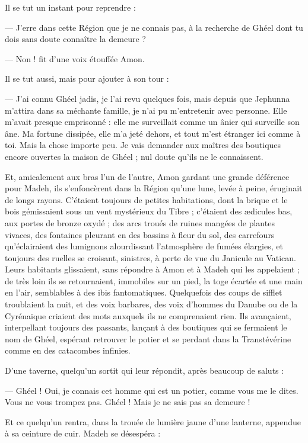 \documentclass[a4paper, 11pt, oneside, polutonikogreek, french]{article}
\begin{document}
Il se tut un instant pour reprendre :

--- J'erre dans cette Région que je ne connais pas, à la recherche de Ghéel dont tu dois sans doute connaître la demeure ?

--- Non ! fit d'une voix étouffée Amon.

Il se tut aussi, mais pour ajouter à son tour :

--- J'ai connu Ghéel jadis, je l'ai revu quelques fois, mais depuis que Jephunna m'attira dans sa méchante famille, je n'ai pu m'entretenir avec personne. Elle m'avait presque emprisonné : elle me surveillait comme un ânier qui surveille son âne. Ma fortune dissipée, elle m'a jeté dehors, et tout m'est étranger ici comme à toi. Mais la chose importe peu. Je vais demander aux maîtres des boutiques encore ouvertes la maison de Ghéel ; nul doute qu'ils ne le connaissent.

Et, amicalement aux bras l'un de l'autre, Amon gardant une grande déférence pour Madeh, ils s'enfoncèrent dans la Région qu'une lune, levée à peine, éruginait de longs rayons. C'étaient toujours de petites habitations, dont la brique et le bois gémissaient sous un vent mystérieux du Tibre ; c'étaient des ædicules bas, aux portes de bronze oxydé ; des arcs troués de ruines mangées de plantes vivaces, des fontaines pleurant en des bassins à fleur du sol, des carrefours qu'éclairaient des lumignons alourdissant l'atmosphère de fumées élargies, et toujours des ruelles se croisant, sinistres, à perte de vue du Janicule au Vatican. Leurs habitants glissaient, sans répondre à Amon et à Madeh qui les appelaient ; de très loin ils se retournaient, immobiles sur un pied, la toge écartée et une main en l'air, semblables à des ibis fantomatiques. Quelquefois des coups de sifflet troublaient la nuit, et des voix barbares, des voix d'hommes du Danube ou de la Cyrénaïque criaient des mots auxquels ils ne comprenaient rien. Ils avançaient, interpellant toujours des passants, lançant à des boutiques qui se fermaient le nom de Ghéel, espérant retrouver le potier et se perdant dans la Transtévérine comme en des catacombes infinies.

D'une taverne, quelqu'un sortit qui leur répondit, après beaucoup de saluts :

--- Ghéel ! Oui, je connais cet homme qui est un potier, comme vous me le dites. Vous ne vous trompez pas. Ghéel ! Mais je ne sais pas sa demeure !

Et ce quelqu'un rentra, dans la trouée de lumière jaune d'une lanterne, appendue à sa ceinture de cuir. Madeh se désespéra :
\end{document}

